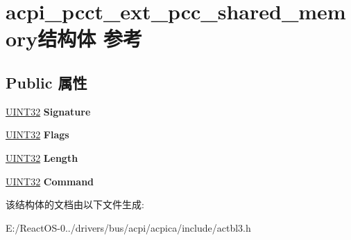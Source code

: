\hypertarget{structacpi__pcct__ext__pcc__shared__memory}{}\section{acpi\+\_\+pcct\+\_\+ext\+\_\+pcc\+\_\+shared\+\_\+memory结构体 参考}
\label{structacpi__pcct__ext__pcc__shared__memory}
\subsection*{Public 属性}
\begin{DoxyCompactItemize}
\item 
\mbox{\label{structacpi__pcct__ext__pcc__shared__memory_aba5373555f85346ee36abd7eecd60484}} 
\hyperlink{_processor_bind_8h_ae1e6edbbc26d6fbc71a90190d0266018}{U\+I\+N\+T32} {\bfseries Signature}
\item 
\mbox{\label{structacpi__pcct__ext__pcc__shared__memory_a6a6814fa2a05cbd11a64d94db2e9ecb4}} 
\hyperlink{_processor_bind_8h_ae1e6edbbc26d6fbc71a90190d0266018}{U\+I\+N\+T32} {\bfseries Flags}
\item 
\mbox{\label{structacpi__pcct__ext__pcc__shared__memory_a8bac9208ca2fede192434151faa8fddc}} 
\hyperlink{_processor_bind_8h_ae1e6edbbc26d6fbc71a90190d0266018}{U\+I\+N\+T32} {\bfseries Length}
\item 
\mbox{\label{structacpi__pcct__ext__pcc__shared__memory_a7e2402299720dc6dc54da10d9af476ca}} 
\hyperlink{_processor_bind_8h_ae1e6edbbc26d6fbc71a90190d0266018}{U\+I\+N\+T32} {\bfseries Command}
\end{DoxyCompactItemize}


该结构体的文档由以下文件生成\+:\begin{DoxyCompactItemize}
\item 
E\+:/\+React\+O\+S-\/0../drivers/bus/acpi/acpica/include/actbl3.\+h\end{DoxyCompactItemize}
